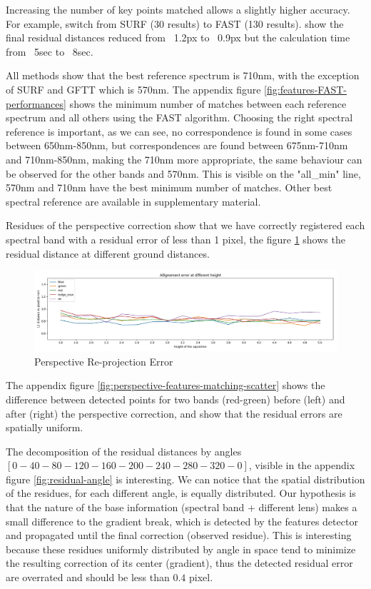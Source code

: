 \documentclass[]{elsarticle}
\begin{document}
	\par Increasing the number of key points matched allows a slightly higher accuracy. For example, switch from SURF (30 results) to FAST (130 results). show the final residual distances reduced from ~1.2px to ~0.9px but the calculation time from ~5sec to ~8sec.
	\\
	\par All methods show that the best reference spectrum is 710nm, with the exception of SURF and GFTT which is 570nm.
	The appendix figure \ref{fig:features-FAST-performances} shows the minimum number of matches between each reference spectrum and all others using the FAST algorithm.
	Choosing the right spectral reference is important, as we can see, no correspondence is found in some cases between 650nm-850nm,
	but correspondences are found between 675nm-710nm and 710nm-850nm, making the 710nm more appropriate,
	the same behaviour can be observed for the other bands and 570nm.
	This is visible on the "all\_min" line, 570nm and 710nm have the best minimum number of matches.
	Other best spectral reference are available in supplementary material.
	\\
	\par Residues of the perspective correction show that we have correctly registered each spectral band with a residual error of less than 1 pixel,
	the figure \ref{fig:perspective-error} shows the residual distance at different ground distances.
	
	\begin{figure}[H]
		\centering
		\includegraphics[width=0.8\linewidth]{../figures/prespective-allignement-rmse.jpg}
		\caption{Perspective Re-projection Error}
		\label{fig:perspective-error}
	\end{figure}
	
	\par The appendix figure \ref{fig:perspective-features-matching-scatter} shows the difference between detected points for two bands (red-green)
	before (left) and after (right) the perspective correction, and show that the residual errors are spatially uniform.
	\\
	\par The decomposition of the residual distances by angles $[0-40-80-120-160-200-240-280-320-0]$, visible in the appendix figure \ref{fig:residual-angle} is interesting.
	We can notice that the spatial distribution of the residues, for each different angle, is equally distributed.
	Our hypothesis is that the nature of the base information (spectral band + different lens) makes a small difference to the gradient break,
	which is detected by the features detector and propagated until the final correction (observed residue).
	This is interesting because these residues uniformly distributed by angle in space tend to minimize the resulting correction of its center (gradient),
	thus the detected residual error are overrated and should be less than $0.4$ pixel.
\end{document}
